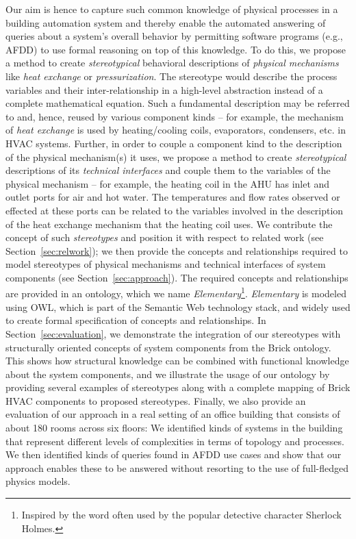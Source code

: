 \documentclass[sigconf]{acmart}
\begin{document}
Our aim is hence to capture such common knowledge of physical processes in a building automation system and thereby enable the automated answering of queries about a system's overall behavior by permitting software programs (e.g., AFDD) to use formal reasoning on top of this knowledge. 
%
To do this, we propose a method to create \textit{stereotypical} behavioral descriptions of \textit{physical mechanisms} like \textit{heat exchange} or \textit{pressurization}.
The stereotype would describe the process variables and their inter-relationship in a high-level abstraction instead of a complete mathematical equation.
Such a fundamental description may be referred to and, hence, reused by various component kinds -- for example, the mechanism of \textit{heat exchange} is used by heating/cooling coils, evaporators, condensers, etc. in HVAC systems.
Further, in order to couple a component kind to the description of the physical mechanism(s) it uses, we propose a method to create \textit{stereotypical} descriptions of its \textit{technical interfaces} and couple them to the variables of the physical mechanism -- for example, the heating coil in the AHU has inlet and outlet ports for air and hot water. The temperatures and flow rates observed or effected at these ports can be related to the variables involved in the description of the heat exchange mechanism that the heating coil uses.
%
We contribute the concept of such \emph{stereotypes} and position it with respect to related work (see Section~\ref{sec:relwork}); we then provide the concepts and relationships required to model stereotypes of physical mechanisms and technical interfaces of system components (see Section~\ref{sec:approach}). The required concepts and relationships are provided in an ontology, which we name \emph{Elementary}\footnote{Inspired by the word often used by the popular detective character Sherlock Holmes.}. \emph{Elementary} is modeled using OWL, which is part of the Semantic Web technology stack, and widely used to create formal specification of concepts and relationships.
%
In Section~\ref{sec:evaluation}, we demonstrate the integration of our stereotypes with structurally oriented concepts of system components from the Brick ontology. This shows how structural knowledge can be combined with functional knowledge about the system components, and we illustrate the usage of our ontology by providing several examples of stereotypes along with a complete mapping of Brick HVAC components to proposed stereotypes.
%
Finally, we also provide an evaluation of our approach in a real setting of an office building that consists of about 180 rooms across six floors: We identified kinds of systems in the building that represent different levels of complexities in terms of topology and processes. We then identified kinds of queries found in AFDD use cases and show that our approach enables these to be answered without resorting to the use of full-fledged physics models.
\end{document}
